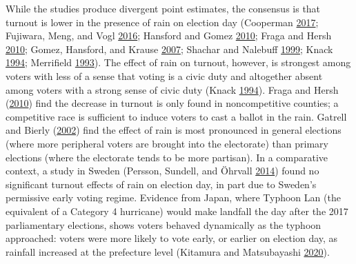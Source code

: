 \documentclass[
  12pt,
]{article}
\begin{document}
While the studies produce divergent point estimates, the consensus is that turnout is lower in the presence of rain on election day (Cooperman \protect\hyperlink{ref-Cooperman2017}{2017}; Fujiwara, Meng, and Vogl \protect\hyperlink{ref-Fujiwara2016}{2016}; Hansford and Gomez \protect\hyperlink{ref-Hansford2010}{2010}; Fraga and Hersh \protect\hyperlink{ref-Fraga2010}{2010}; Gomez, Hansford, and Krause \protect\hyperlink{ref-Gomez2007}{2007}; Shachar and Nalebuff \protect\hyperlink{ref-Shachar1999}{1999}; Knack \protect\hyperlink{ref-Knack1994}{1994}; Merrifield \protect\hyperlink{ref-Merrifield1993}{1993}). The effect of rain on turnout, however, is strongest among voters with less of a sense that voting is a civic duty and altogether absent among voters with a strong sense of civic duty (Knack \protect\hyperlink{ref-Knack1994}{1994}). Fraga and Hersh (\protect\hyperlink{ref-Fraga2010}{2010}) find the decrease in turnout is only found in noncompetitive counties; a competitive race is sufficient to induce voters to cast a ballot in the rain. Gatrell and Bierly (\protect\hyperlink{ref-Gatrell2002}{2002}) find the effect of rain is most pronounced in general elections (where more peripheral voters are brought into the electorate) than primary elections (where the electorate tends to be more partisan). In a comparative context, a study in Sweden (Persson, Sundell, and Öhrvall \protect\hyperlink{ref-Persson2014}{2014}) found no significant turnout effects of rain on election day, in part due to Sweden's permissive early voting regime. Evidence from Japan, where Typhoon Lan (the equivalent of a Category 4 hurricane) would make landfall the day after the 2017 parliamentary elections, shows voters behaved dynamically as the typhoon approached: voters were more likely to vote early, or earlier on election day, as rainfall increased at the prefecture level (Kitamura and Matsubayashi \protect\hyperlink{ref-Kitamura2020}{2020}).
\end{document}
